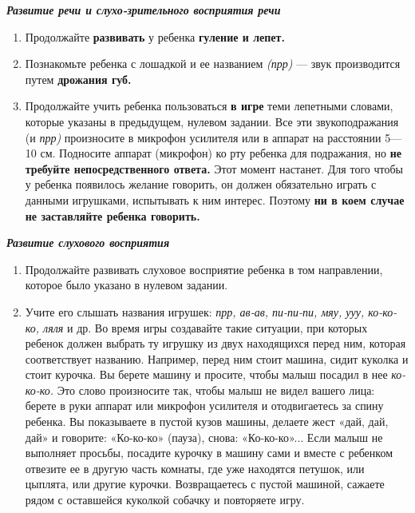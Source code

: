 \documentclass[a5paper]{book}
\renewcommand{\emph}[1]{\textit{#1}}
\begin{document}
\emph{\textbf{Развитие речи и слухо-зрительного восприятия речи}}


\begin{enumerate}
\def\labelenumi{\arabic{enumi}.}
\item
  
  Продолжайте \textbf{развивать} у ребенка \textbf{гуление и лепет.}
  
\item
  
  Познакомьте ребенка с лошадкой и ее названием \emph{(прр)} --- звук
  производится путем \textbf{дрожания губ.}
  
\item
  
  Продолжайте учить ребенка пользоваться \textbf{в игре} теми лепетными
  словами, которые указаны в предыдущем, нулевом задании. Все эти
  звукоподражания (и \emph{прр)} произносите в микрофон усилителя или в
  аппарат на расстоянии 5---10 см. Подносите аппарат (микрофон) ко рту
  ребенка для подражания, но \textbf{не требуйте непосредственного
  ответа.} Этот момент настанет. Для того чтобы у ребенка появилось
  желание говорить, он должен обязательно играть с данными игрушками,
  испытывать к ним интерес. Поэтому \textbf{ни в коем случае не
  заставляйте ребенка говорить.}
  
\end{enumerate}


\emph{\textbf{Развитие слухового восприятия}}


\begin{enumerate}
\def\labelenumi{\arabic{enumi}.}
\item
  
  Продолжайте развивать слуховое восприятие ребенка в том направлении,
  которое было указано в нулевом задании.
  
\item
  
  Учите его слышать названия игрушек: \emph{прр, ав-ав, пи-пи-пи, мяу,
  ууу, ко-ко-ко, ляля} и др. Во время игры создавайте такие ситуации,
  при которых ребенок должен выбрать ту игрушку из двух находящихся
  перед ним, которая соответствует названию. Например, перед ним стоит
  машина, сидит куколка и стоит курочка. Вы берете машину и просите,
  чтобы малыш посадил в нее \emph{ко-ко-ко.} Это слово произносите так,
  чтобы малыш не видел вашего лица: берете в руки аппарат или микрофон
  усилителя и отодвигаетесь за спину ребенка. Вы показываете в пустой
  кузов машины, делаете жест «дай, дай, дай» и говорите: «Ко-ко-ко»
  (пауза), снова: «Ко-ко-ко»... Если малыш не выполняет просьбы,
  посадите курочку в машину сами и вместе с ребенком отвезите ее в
  другую часть комнаты, где уже находятся петушок, или цыплята, или
  другие курочки. Возвращаетесь с пустой машиной, сажаете рядом с
  оставшейся куколкой собачку и повторяете игру.
  
\end{enumerate}
\end{document}
